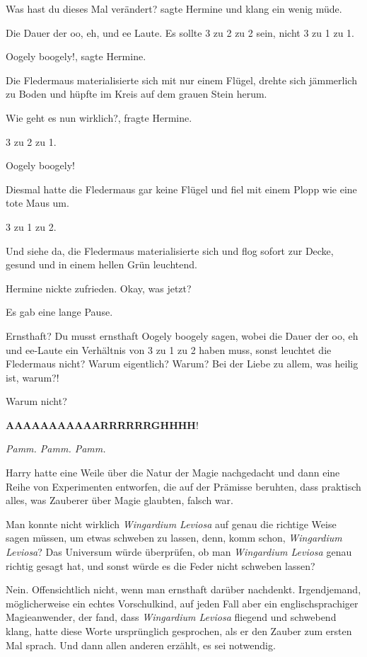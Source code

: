 \glqq{}Was hast du dieses Mal verändert?\grqq{} sagte Hermine und klang ein
wenig müde.

\glqq{}Die Dauer der oo, eh, und ee Laute. Es sollte 3 zu 2 zu 2 sein, nicht 3
zu 1 zu 1.\grqq{}

\glqq{}Oogely boogely!\grqq{}, sagte Hermine.

Die Fledermaus materialisierte sich mit nur einem Flügel, drehte sich jämmerlich
zu Boden und hüpfte im Kreis auf dem grauen Stein herum.

\glqq{}Wie geht es nun wirklich?\grqq{}, fragte Hermine.

\glqq{}3 zu 2 zu 1.\grqq{}

\glqq{}Oogely boogely!\grqq{}

Diesmal hatte die Fledermaus gar keine Flügel und fiel mit einem Plopp wie eine
tote Maus um.

\glqq{}3 zu 1 zu 2.\grqq{}

Und siehe da, die Fledermaus materialisierte sich und flog sofort zur Decke,
gesund und in einem hellen Grün leuchtend.

Hermine nickte zufrieden. \glqq{}Okay, was jetzt?\grqq{}

Es gab eine lange Pause.

\glqq{}Ernsthaft? Du musst ernsthaft Oogely boogely sagen, wobei die Dauer der
oo, eh und ee-Laute ein Verhältnis von 3 zu 1 zu 2 haben muss, sonst leuchtet
die Fledermaus nicht? Warum eigentlich? Warum? Bei der Liebe zu allem, was
heilig ist, warum?!\grqq{}

\glqq{}Warum nicht?\grqq{}

\glqq{}\textbf{AAAAAAAAAAARRRRRRGHHHH}!\grqq{}

\emph{Pamm. Pamm. Pamm.}

Harry hatte eine Weile über die Natur der Magie nachgedacht und dann eine Reihe
von Experimenten entworfen, die auf der Prämisse beruhten, dass praktisch alles,
was Zauberer über Magie glaubten, falsch war.

Man konnte nicht wirklich \emph{\glqq{}Wingardium Leviosa\grqq{}} auf genau die
richtige Weise sagen müssen, um etwas schweben zu lassen, denn, komm schon,
\emph{\glqq{}Wingardium Leviosa\grqq{}}? Das Universum würde überprüfen, ob man
\emph{\glqq{}Wingardium Leviosa\grqq{}} genau richtig gesagt hat, und sonst
würde es die Feder nicht schweben lassen?

Nein. Offensichtlich nicht, wenn man ernsthaft darüber nachdenkt. Irgendjemand,
möglicherweise ein echtes Vorschulkind, auf jeden Fall aber ein
englischsprachiger Magieanwender, der fand, dass \emph{\glqq{}Wingardium
Leviosa\grqq{}} fliegend und schwebend klang, hatte diese Worte ursprünglich
gesprochen, als er den Zauber zum ersten Mal sprach. Und dann allen anderen
erzählt, es sei notwendig.

